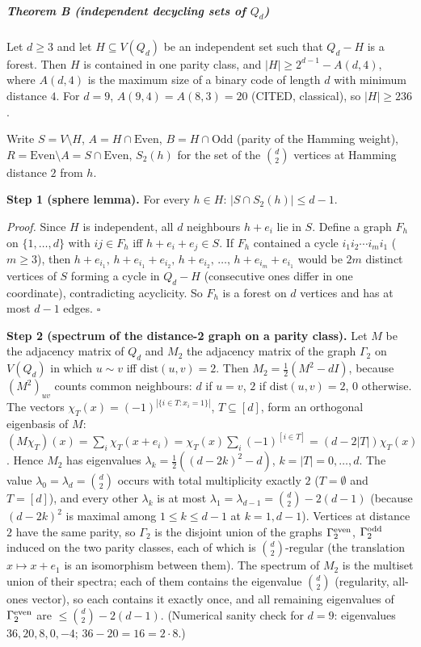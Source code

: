 \documentclass[11pt,a4paper]{article}
\begin{document}
\subparagraph{\texorpdfstring{Theorem B (independent decycling sets of
\(Q_d\))}{Theorem B (independent decycling sets of Q\_d)}}\label{theorem-b-independent-decycling-sets-of-q_d}

Let \(d\ge3\) and let \(H\subseteq V(Q_d)\) be an independent set such
that \(Q_d-H\) is a forest. Then \(H\) is contained in one parity class,
and \(|H|\ge 2^{d-1}-A(d,4)\), where \(A(d,4)\) is the maximum size of a
binary code of length \(d\) with minimum distance \(4\). For \(d=9\),
\(A(9,4)=A(8,3)=20\) (CITED, classical), so \(|H|\ge236\).

Write \(S=V\setminus H\), \(A=H\cap\text{Even}\), \(B=H\cap\text{Odd}\)
(parity of the Hamming weight),
\(R=\text{Even}\setminus A=S\cap\text{Even}\), \(S_2(h)\) for the set of
the \(\binom d2\) vertices at Hamming distance \(2\) from \(h\).

\textbf{Step 1 (sphere lemma).} For every \(h\in H\):
\(|S\cap S_2(h)|\le d-1\).

\emph{Proof.} Since \(H\) is independent, all \(d\) neighbours \(h+e_i\)
lie in \(S\). Define a graph \(F_h\) on \(\{1,\dots,d\}\) with
\(ij\in F_h\) iff \(h+e_i+e_j\in S\). If \(F_h\) contained a cycle
\(i_1i_2\cdots i_mi_1\) (\(m\ge3\)), then
\(h+e_{i_1},\,h+e_{i_1}+e_{i_2},\,h+e_{i_2},\,\dots,\,h+e_{i_m}+e_{i_1}\)
would be \(2m\) distinct vertices of \(S\) forming a cycle in \(Q_d-H\)
(consecutive ones differ in one coordinate), contradicting acyclicity.
So \(F_h\) is a forest on \(d\) vertices and has at most \(d-1\) edges.
\(\square\)

\textbf{Step 2 (spectrum of the distance-2 graph on a parity class).}
Let \(M\) be the adjacency matrix of \(Q_d\) and \(M_2\) the adjacency
matrix of the graph \(\Gamma_2\) on \(V(Q_d)\) in which \(u\sim v\) iff
\(\mathrm{dist}(u,v)=2\). Then \(M_2=\tfrac12(M^2-dI)\), because
\((M^2)_{uv}\) counts common neighbours: \(d\) if \(u=v\), \(2\) if
\(\mathrm{dist}(u,v)=2\), \(0\) otherwise. The vectors
\(\chi_T(x)=(-1)^{|\{i\in T:x_i=1\}|}\), \(T\subseteq[d]\), form an
orthogonal eigenbasis of \(M\):
\((M\chi_T)(x)=\sum_i\chi_T(x+e_i)=\chi_T(x)\sum_i(-1)^{[i\in T]}=(d-2|T|)\chi_T(x)\).
Hence \(M_2\) has eigenvalues \(\lambda_k=\tfrac12((d-2k)^2-d)\),
\(k=|T|=0,\dots,d\). The value \(\lambda_0=\lambda_d=\binom d2\) occurs
with total multiplicity exactly \(2\) (\(T=\emptyset\) and \(T=[d]\)),
and every other \(\lambda_k\) is at most
\(\lambda_1=\lambda_{d-1}=\binom d2-2(d-1)\) (because \((d-2k)^2\) is
maximal among \(1\le k\le d-1\) at \(k=1,d-1\)). Vertices at distance
\(2\) have the same parity, so \(\Gamma_2\) is the disjoint union of the
graphs \(\Gamma_2^{\rm even}\), \(\Gamma_2^{\rm odd}\) induced on the
two parity classes, each of which is \(\binom d2\)-regular (the
translation \(x\mapsto x+e_1\) is an isomorphism between them). The
spectrum of \(M_2\) is the multiset union of their spectra; each of them
contains the eigenvalue \(\binom d2\) (regularity, all-ones vector), so
each contains it exactly once, and all remaining eigenvalues of
\(\Gamma_2^{\rm even}\) are \(\le\binom d2-2(d-1)\). (Numerical sanity
check for \(d=9\): eigenvalues \(36,20,8,0,-4\); \(36-20=16=2\cdot8\).)
\end{document}
